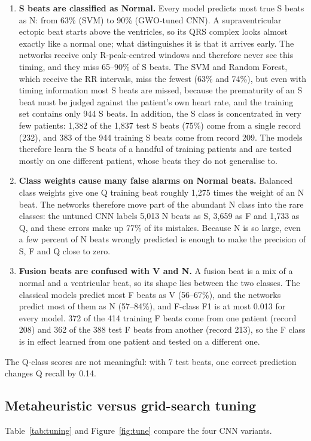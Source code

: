 \documentclass[11pt,a4paper]{article}
\begin{document}
\begin{enumerate}
\item \textbf{S beats are classified as Normal.} Every model predicts most true S beats as N: from 63\% (SVM) to 90\% (GWO-tuned CNN). A supraventricular ectopic beat starts above the ventricles, so its QRS complex looks almost exactly like a normal one; what distinguishes it is that it arrives early. The networks receive only R-peak-centred windows and therefore never see this timing, and they miss 65--90\% of S beats. The SVM and Random Forest, which receive the RR intervals, miss the fewest (63\% and 74\%), but even with timing information most S beats are missed, because the prematurity of an S beat must be judged against the patient's own heart rate, and the training set contains only 944 S beats. In addition, the S class is concentrated in very few patients: 1,382 of the 1,837 test S beats (75\%) come from a single record (232), and 383 of the 944 training S beats come from record 209. The models therefore learn the S beats of a handful of training patients and are tested mostly on one different patient, whose beats they do not generalise to.
\item \textbf{Class weights cause many false alarms on Normal beats.} Balanced class weights give one Q training beat roughly 1,275 times the weight of an N beat. The networks therefore move part of the abundant N class into the rare classes: the untuned CNN labels 5,013 N beats as S, 3,659 as F and 1,733 as Q, and these errors make up 77\% of its mistakes. Because N is so large, even a few percent of N beats wrongly predicted is enough to make the precision of S, F and Q close to zero.
\item \textbf{Fusion beats are confused with V and N.} A fusion beat is a mix of a normal and a ventricular beat, so its shape lies between the two classes. The classical models predict most F beats as V (56--67\%), and the networks predict most of them as N (57--84\%), and F-class F1 is at most 0.013 for every model. 372 of the 414 training F beats come from one patient (record 208) and 362 of the 388 test F beats from another (record 213), so the F class is in effect learned from one patient and tested on a different one.
\end{enumerate}

The Q-class scores are not meaningful: with 7 test beats, one correct prediction changes Q recall by 0.14.

\subsection{Metaheuristic versus grid-search tuning}
Table~\ref{tab:tuning} and Figure~\ref{fig:tune} compare the four CNN variants.
\end{document}
